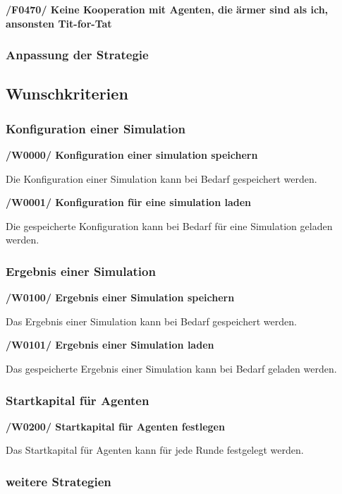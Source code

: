 \textbf{/F0470/ Keine Kooperation mit Agenten, die ärmer sind als ich, ansonsten Tit-for-Tat}

\subsubsection{Anpassung der Strategie}


\subsection{Wunschkriterien}

\subsubsection{Konfiguration einer Simulation}

\textbf{/W0000/ Konfiguration einer simulation  speichern}

Die Konfiguration einer Simulation kann bei Bedarf gespeichert werden.

\textbf{/W0001/ Konfiguration für eine simulation laden}

Die gespeicherte Konfiguration kann bei Bedarf für eine Simulation geladen werden.

\subsubsection{Ergebnis einer Simulation}

\textbf{/W0100/ Ergebnis einer Simulation speichern}

Das Ergebnis einer Simulation kann bei Bedarf gespeichert werden.

\textbf{/W0101/ Ergebnis einer Simulation laden}

Das gespeicherte Ergebnis einer Simulation kann bei Bedarf geladen werden.

\subsubsection{Startkapital für Agenten}

\textbf{/W0200/ Startkapital für Agenten festlegen}

Das Startkapital für Agenten kann für jede Runde festgelegt werden.

\subsubsection{weitere Strategien}

